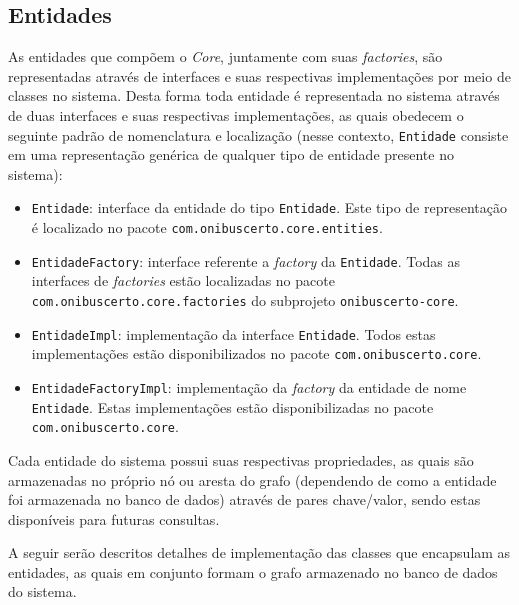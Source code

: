 \subsection{Entidades}
As entidades que compõem o \emph{Core}, juntamente com suas \emph{factories}, são representadas através de interfaces e suas respectivas implementações por meio de classes no sistema. 
Desta forma toda entidade é representada no sistema através de duas interfaces e suas respectivas implementações, as quais obedecem o seguinte padrão de nomenclatura e localização (nesse contexto, \texttt{Entidade} consiste em uma representação genérica de qualquer tipo de entidade presente no sistema):
\begin{itemize}
	\item \texttt{Entidade}: interface da entidade do tipo \texttt{Entidade}.
		  Este tipo de representação é localizado no pacote \texttt{com.onibuscerto.core.entities}.
	\item \texttt{EntidadeFactory}: interface referente a \emph{factory} da \texttt{Entidade}.
		  Todas as interfaces de \emph{factories} estão localizadas no pacote \texttt{com.onibuscerto.core.factories} do subprojeto \texttt{onibuscerto-core}.
	\item \texttt{EntidadeImpl}: implementação da interface \texttt{Entidade}.
		  Todos estas implementações estão disponibilizados no pacote \texttt{com.onibuscerto.core}.
	\item \texttt{EntidadeFactoryImpl}: implementação da \emph{factory} da entidade de nome \texttt{Entidade}.
		  Estas implementações estão disponibilizadas no pacote \texttt{com.onibuscerto.core}.
\end{itemize}

Cada entidade do sistema possui suas respectivas propriedades, as quais são armazenadas no próprio nó ou aresta do grafo (dependendo de como a entidade foi armazenada no banco de dados) através de pares chave/valor, sendo estas disponíveis para futuras consultas.


A seguir serão descritos detalhes de implementação das classes que encapsulam as entidades, as quais em conjunto formam o grafo armazenado no banco de dados do sistema.

